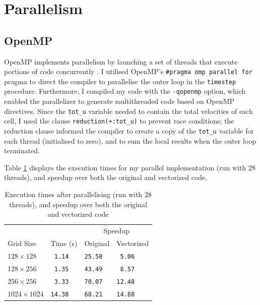 \documentclass[twocolumn, a4paper]{article}
\begin{document}
\section{Parallelism}


\subsection{OpenMP}

OpenMP implements parallelism by launching a set of threads that execute portions of code concurrently \cite{openmp_cornell}.
I utilised OpenMP's \texttt{\#pragma omp parallel for} pragma to direct the compiler to parallelise the outer loop in the \texttt{timestep} procedure.
Furthermore, I compiled my code with the \texttt{-qopenmp} option, which enabled the parallelizer to generate multithreaded code based on OpenMP directives.
Since the \texttt{tot\_u} variable needed to contain the total velocities of each cell, I used the clause \texttt{reduction(+:tot\_u)} to prevent race conditions; the reduction clause informed the compiler to create a copy of the \texttt{tot\_u} variable for each thread (initialised to zero), and to sum the local results when the outer loop terminated.

Table \ref{tab:parallelised} displays the execution times for my parallel implementation (run with 28 threads), and speedup over both the original and vectorized code.

\begin{table}[htbp]
  \begin{center}
  \caption{Execution times after parallelising (run with 28 threads), and speedup over both the original and vectorized code}\label{tab:parallelised}
  \begin{tabular}{l | l  l  l} 
      \hline\hline
      &&\multicolumn{2}{c}{Speedup}\\
      \cline{3-4}
      Grid Size&Time (s)&Original&Vectorized\\
      \hline
      $128 \times 128$&\texttt{ 1.14}&\texttt{25.58}&\texttt{ 5.06}\\
      $128 \times 256$&\texttt{ 1.35}&\texttt{43.49}&\texttt{ 8.57}\\
      $256 \times 256$&\texttt{ 3.33}&\texttt{70.07}&\texttt{12.48}\\
      $1024 \times 1024$&\texttt{14.38}&\texttt{68.21}&\texttt{14.88}\\
      \hline
    \end{tabular}
  \end{center}
\end{table}
\end{document}
